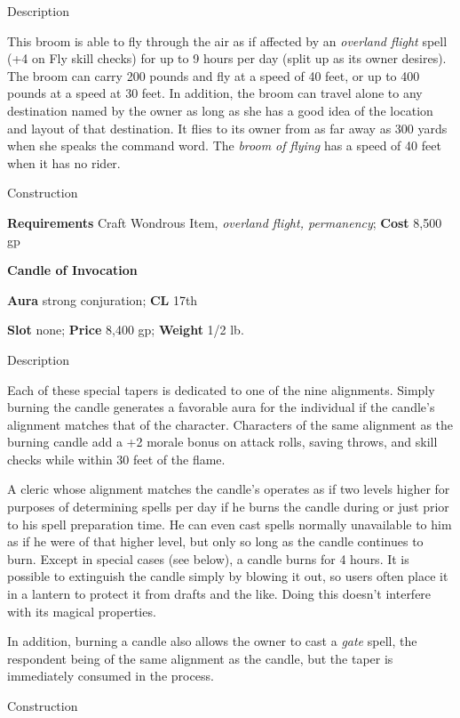 Description
				
This broom is able to fly through the air as if affected by an\textit{ overland flight }spell (+4 on Fly skill checks) for up to 9 hours per day (split up as its owner desires). The broom can carry 200 pounds and fly at a speed of 40 feet, or up to 400 pounds at a speed at 30 feet. In addition, the broom can travel alone to any destination named by the owner as long as she has a good idea of the location and layout of that destination. It flies to its owner from as far away as 300 yards when she speaks the command word. The \textit{broom of flying }has a speed of 40 feet when it has no rider. 
				
Construction
				
\textbf{Requirements} Craft Wondrous Item, \textit{overland flight, permanency}; \textbf{Cost }8,500 gp
				
\textbf{Candle of Invocation}
				
\textbf{Aura} strong conjuration;\textbf{ CL }17th
				
\textbf{Slot} none; \textbf{Price} 8,400 gp; \textbf{Weight} 1/2 lb.
				
Description
				
Each of these special tapers is dedicated to one of the nine alignments. Simply burning the candle generates a favorable aura for the individual if the candle's alignment matches that of the character. Characters of the same alignment as the burning candle add a +2 morale bonus on attack rolls, saving throws, and skill checks while within 30 feet of the flame.
				
A cleric whose alignment matches the candle's operates as if two levels higher for purposes of determining spells per day if he burns the candle during or just prior to his spell preparation time. He can even cast spells normally unavailable to him as if he were of that higher level, but only so long as the candle continues to burn. Except in special cases (see below), a candle burns for 4 hours. It is possible to extinguish the candle simply by blowing it out, so users often place it in a lantern to protect it from drafts and the like. Doing this doesn't interfere with its magical properties.
				
In addition, burning a candle also allows the owner to cast a \textit{gate }spell, the respondent being of the same alignment as the candle, but the taper is immediately consumed in the process. 
				
Construction
				

